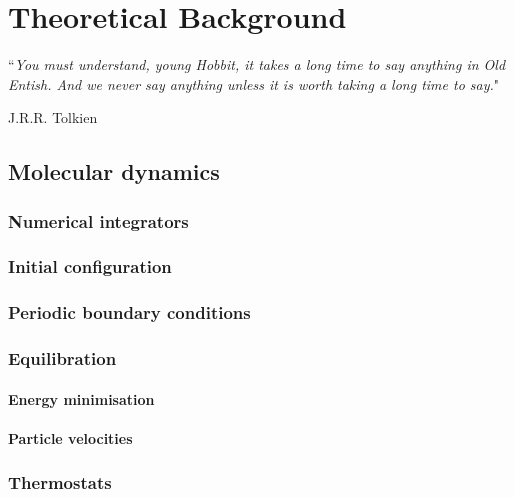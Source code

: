 \chapter{Theoretical Background}
\label{chapter:background}

\epigraph{``\textit{You must understand, young Hobbit, it takes a long time to say anything in Old Entish. And we never say anything unless it is worth taking a long time to say.}"}{J.R.R. Tolkien}

\section{Molecular dynamics}\label{chapter:MD}

\subsection{Numerical integrators} \label{sec:integrators}
%
%

\subsection{Initial configuration} 

\subsection{Periodic boundary conditions}

\subsection{Equilibration} \label{sec:equilibration}

\subsubsection{Energy minimisation}

\subsubsection{Particle velocities}

\subsection{Thermostats}
%


